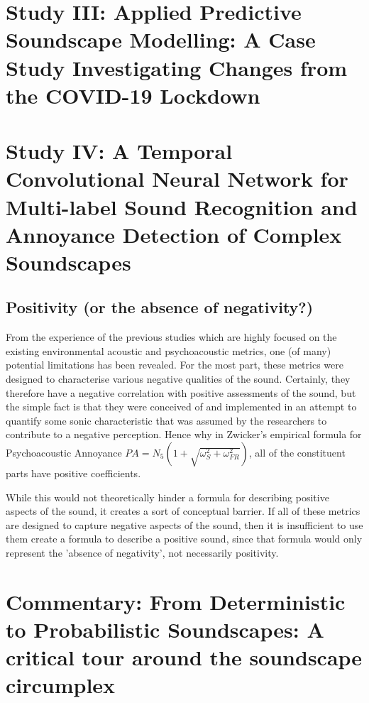 \documentclass[twoside,fontsize=12pt,titlepage]{scrbook}
\begin{document}
 

\section[Study III]{Study III: Applied Predictive Soundscape Modelling: A Case Study Investigating Changes from the COVID-19 Lockdown}

 \newpage
\section[Study IV]{Study IV: A Temporal Convolutional Neural Network for Multi-label Sound Recognition and Annoyance Detection of Complex Soundscapes}

\subsection{Positivity (or the absence of negativity?)}
From the experience of the previous studies which are highly focused on the existing environmental acoustic and psychoacoustic metrics, one (of many) potential limitations has been revealed. For the most part, these metrics were designed to characterise various negative qualities of the sound. Certainly, they therefore have a negative correlation with positive assessments of the sound, but the simple fact is that they were conceived of and implemented in an attempt to quantify some sonic characteristic that was assumed by the researchers to contribute to a negative perception. Hence why in Zwicker's empirical formula for Psychoacoustic Annoyance \citep{PsychoacousticsfactsmodelsZwicker} $PA = N_5 (1 + \sqrt{\omega^2_S + \omega^2_{FR}})$, all of the constituent parts have positive coefficients.

While this would not theoretically hinder a formula for describing positive aspects of the sound, it creates a sort of conceptual barrier. If all of these metrics are designed to capture negative aspects of the sound, then it is insufficient to use them create a formula to describe a positive sound, since that formula would only represent the 'absence of negativity', not necessarily positivity.


 

\section[Commentary]{Commentary: From Deterministic to Probabilistic Soundscapes: A critical tour around the soundscape circumplex}
\end{document}
